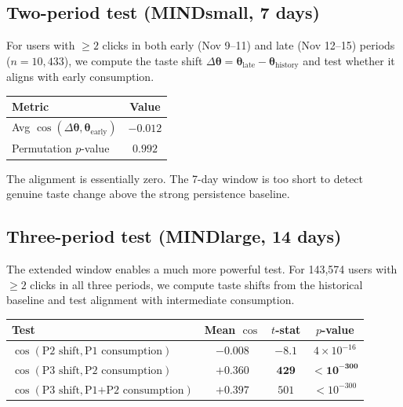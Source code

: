 \documentclass[11pt]{article}
\begin{document}
\subsection{Two-period test (MINDsmall, 7 days)}

For users with $\geq 2$ clicks in both early (Nov 9--11) and late (Nov 12--15) periods ($n = 10{,}433$), we compute the taste shift $\Delta\boldsymbol{\theta} = \boldsymbol{\theta}_{\text{late}} - \boldsymbol{\theta}_{\text{history}}$ and test whether it aligns with early consumption.

\begin{center}
\begin{tabular}{lc}
\toprule
Metric & Value \\
\midrule
Avg $\cos(\Delta\boldsymbol{\theta}, \boldsymbol{\theta}_{\text{early}})$ & $-0.012$ \\
Permutation $p$-value & $0.992$ \\
\bottomrule
\end{tabular}
\end{center}

The alignment is essentially zero. The 7-day window is too short to detect genuine taste change above the strong persistence baseline.

\subsection{Three-period test (MINDlarge, 14 days)}
\label{sec:three_period}

The extended window enables a much more powerful test. For 143,574 users with $\geq 2$ clicks in all three periods, we compute taste shifts from the historical baseline and test alignment with intermediate consumption.

\begin{center}
\begin{tabular}{lccc}
\toprule
Test & Mean $\cos$ & $t$-stat & $p$-value \\
\midrule
$\cos(\text{P2 shift}, \text{P1 consumption})$ & $-0.008$ & $-8.1$ & $4 \times 10^{-16}$ \\
$\cos(\text{P3 shift}, \text{P2 consumption})$ & $\boldsymbol{+0.360}$ & $\boldsymbol{429}$ & $\boldsymbol{< 10^{-300}}$ \\
$\cos(\text{P3 shift}, \text{P1{+}P2 consumption})$ & $+0.397$ & $501$ & $< 10^{-300}$ \\
\bottomrule
\end{tabular}
\end{center}
\end{document}
